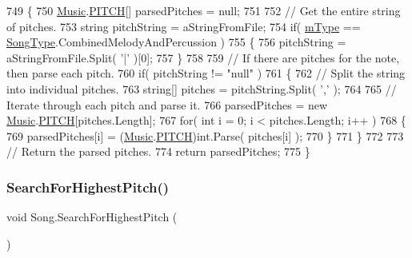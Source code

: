 \begin{DoxyCode}
749     \{
750         \hyperlink{class_music}{Music}.\hyperlink{group___music_enums_ga508f69b199ea518f935486c990edac1d}{PITCH}[] parsedPitches = null;
751 
752         \textcolor{comment}{// Get the entire string of pitches.}
753         \textcolor{keywordtype}{string} pitchString = aStringFromFile;
754         \textcolor{keywordflow}{if}( \hyperlink{group___song_priv_var_gaf3b9d0f461522324f897b746311b43c5}{mType} == \hyperlink{group___song_enums_gae681a1f001333e39fc1cb4fea97bfe1b}{SongType}.CombinedMelodyAndPercussion )
755         \{
756             pitchString = aStringFromFile.Split( \textcolor{charliteral}{'|'} )[0];
757         \}
758 
759         \textcolor{comment}{// If there are pitches for the note, then parse each pitch.}
760         \textcolor{keywordflow}{if}( pitchString != \textcolor{stringliteral}{"null"} )
761         \{
762             \textcolor{comment}{// Split the string into individual pitches.}
763             \textcolor{keywordtype}{string}[] pitches = pitchString.Split( \textcolor{charliteral}{','} );
764 
765             \textcolor{comment}{// Iterate through each pitch and parse it.}
766             parsedPitches = \textcolor{keyword}{new} \hyperlink{class_music}{Music}.\hyperlink{group___music_enums_ga508f69b199ea518f935486c990edac1d}{PITCH}[pitches.Length];
767             \textcolor{keywordflow}{for}( \textcolor{keywordtype}{int} i = 0; i < pitches.Length; i++ )
768             \{
769                 parsedPitches[i] = (\hyperlink{class_music}{Music}.\hyperlink{group___music_enums_ga508f69b199ea518f935486c990edac1d}{PITCH})\textcolor{keywordtype}{int}.Parse( pitches[i] );
770             \}
771         \}
772 
773         \textcolor{comment}{// Return the parsed pitches.}
774         \textcolor{keywordflow}{return} parsedPitches;
775     \}
\end{DoxyCode}
\mbox{\label{group___song_priv_func_ga5f837e6b7f576732fa38747caa057621}} 
\subsubsection{\texorpdfstring{Search\+For\+Highest\+Pitch()}{SearchForHighestPitch()}}
{\footnotesize\ttfamily void Song.\+Search\+For\+Highest\+Pitch (\begin{DoxyParamCaption}{ }\end{DoxyParamCaption})\hspace{0.3cm}{\ttfamily [private]}}




